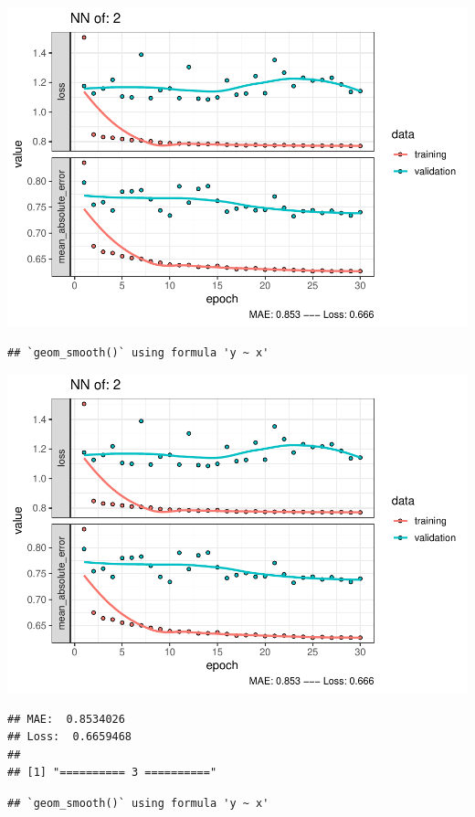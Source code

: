 \documentclass[
]{article}
\begin{document}
\includegraphics{project-code_files/figure-latex/unnamed-chunk-18-3.pdf}

\begin{verbatim}
## `geom_smooth()` using formula 'y ~ x'
\end{verbatim}

\includegraphics{project-code_files/figure-latex/unnamed-chunk-18-4.pdf}

\begin{verbatim}
## MAE:  0.8534026
## Loss:  0.6659468 
## 
## [1] "========== 3 =========="
\end{verbatim}

\begin{verbatim}
## `geom_smooth()` using formula 'y ~ x'
\end{verbatim}
\end{document}
